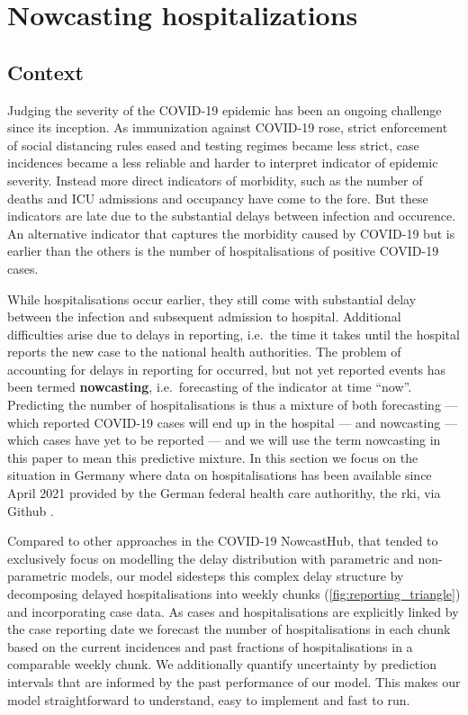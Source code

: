 \section{Nowcasting hospitalizations}%
\label{sec:nowcasting_hospitalizations}
\subsection{Context}
Judging the severity of the COVID-19 epidemic has been an ongoing challenge since its inception. As immunization against COVID-19 rose, strict enforcement of social distancing rules eased and testing regimes became less strict, case incidences became a less reliable and harder to interpret indicator of epidemic severity. Instead more direct indicators of morbidity, such as the number of deaths and ICU admissions and occupancy have come to the fore. But these indicators are late due to the substantial delays between infection and occurence. An alternative indicator that captures the morbidity caused by COVID-19 but is earlier than the others is the number of hospitalisations of positive COVID-19
cases.

While hospitalisations occur earlier, they still come with substantial delay between the infection and subsequent admission to hospital. Additional difficulties arise due to delays in reporting, i.e.~the time it takes until the hospital reports the new case to the national health authorities. The problem of accounting for delays in reporting for occurred, but not yet reported events has been termed \textbf{nowcasting}, i.e.~forecasting of the indicator at time ``now''. Predicting the number of hospitalisations is thus a mixture of both forecasting --- which reported COVID-19 cases will end up in the hospital --- and nowcasting --- which cases have yet to be reported --- and we will use the term nowcasting in this paper to mean this predictive mixture. In this section we focus on the situation in Germany where data on hospitalisations has been available since April 2021 provided by the German federal health care authorithy, the \gls{rki}, via Github \cite{RobertKoch-Institut2021COVID19Hospitalisierungen}. 

Compared to other approaches in the COVID-19 NowcastHub, that tended to exclusively focus on modelling the delay distribution with parametric and non-parametric models, our model sidesteps this complex delay structure by decomposing delayed hospitalisations into weekly chunks (\cref{fig:reporting_triangle}) and incorporating case data. As cases and hospitalisations are explicitly linked by the case reporting date we forecast the number of hospitalisations in each chunk based on the current incidences and past fractions of hospitalisations in a comparable weekly chunk. We additionally quantify uncertainty by prediction intervals that are informed by the past performance of our model. This makes our model straightforward to understand, easy to implement and fast to run.

